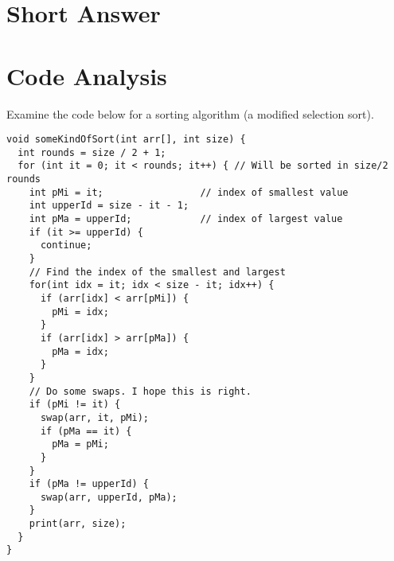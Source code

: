 \documentclass[11pt,answers]{exam}
\begin{document}
\begin{questions}
\newpage
\section*{Short Answer}
	
\newpage

\section*{Code Analysis}

\question[20] Examine the code below for a sorting algorithm (a modified selection sort).
\begin{lstlisting}
void someKindOfSort(int arr[], int size) {
  int rounds = size / 2 + 1;
  for (int it = 0; it < rounds; it++) { // Will be sorted in size/2 rounds
    int pMi = it;                 // index of smallest value
    int upperId = size - it - 1;
    int pMa = upperId;            // index of largest value
    if (it >= upperId) {
      continue;
    }
    // Find the index of the smallest and largest
    for(int idx = it; idx < size - it; idx++) {
      if (arr[idx] < arr[pMi]) {
        pMi = idx;
      }
      if (arr[idx] > arr[pMa]) {
        pMa = idx;
      }
    }
    // Do some swaps. I hope this is right.
    if (pMi != it) {
      swap(arr, it, pMi);
      if (pMa == it) {
        pMa = pMi;
      }
    }
    if (pMa != upperId) {
      swap(arr, upperId, pMa);
    }
    print(arr, size);
  }
}


\end{lstlisting}
\end{questions}
\end{document}
